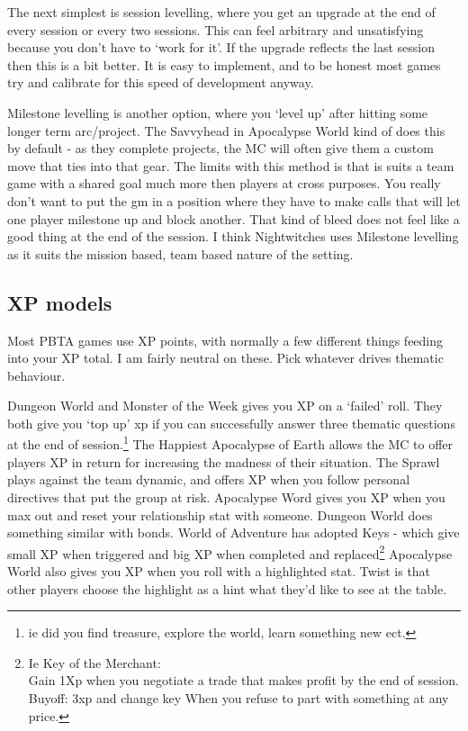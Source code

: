 \documentclass{tufte-handout}
\begin{document}
The next simplest is session levelling, where you get an upgrade at the end of every session or every two sessions. This can feel arbitrary and unsatisfying because you don't have to `work for it'. If the upgrade reflects the last session then this is a bit better. It is easy to implement, and to be honest most games try and calibrate for this speed of development anyway. 

Milestone levelling is another option, where you `level up' after hitting some longer term arc/project. The Savvyhead in Apocalypse World kind of does this by default - as they complete projects, the MC will often give them a custom move that ties into that gear. The limits with this method is that is suits a team game with a shared goal much more then players at cross purposes. You really don't want to put the gm in a position where they have to make calls that will let one player milestone up and block another. That kind of bleed does not feel like a good thing at the end of the session.  I think Nightwitches uses Milestone levelling as it suits the mission based, team based nature of the setting.

\subsection{XP models}
Most PBTA games use XP points, with normally a few different things feeding into your XP total. I am fairly neutral on these. Pick whatever drives thematic behaviour.

Dungeon World and Monster of the Week gives you XP on a `failed' roll.
They both give you `top up' xp if you can successfully answer three thematic questions at the end of session.\footnote{ie did you find treasure, explore the world, learn something new ect.}
The Happiest Apocalypse of Earth allows the MC to offer players XP in return for increasing the madness of their situation.
The Sprawl plays against the team dynamic, and offers XP when you follow personal directives that put the group at risk.
Apocalypse Word gives you XP when you max out and reset your relationship stat with someone. Dungeon World does something similar with bonds. 
World of Adventure has adopted Keys - which give small XP when triggered and big XP when completed and replaced\footnote{Ie Key of the Merchant: \\ Gain 1Xp when you negotiate a trade that makes profit by the end of session. \\ Buyoff: 3xp and change key When you refuse to part with something at any price.}
Apocalypse World also gives you XP when you roll with a highlighted stat. Twist is that other players choose the highlight as a hint what they'd like to see at the table. 
\end{document}
